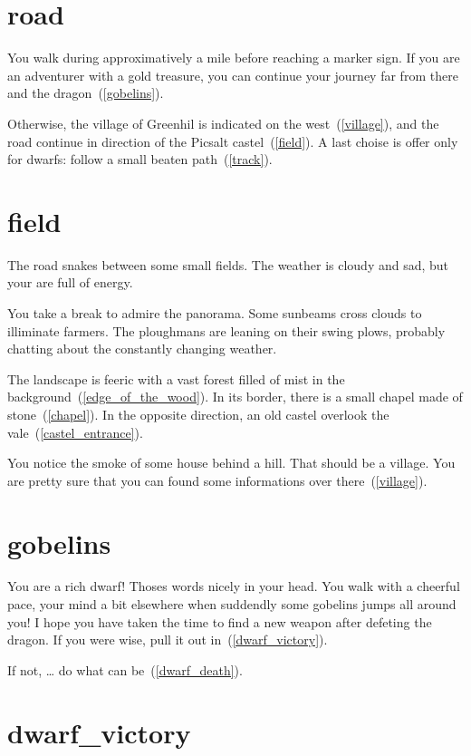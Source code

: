 \section{road}

You walk during approximatively a mile before reaching a marker sign. If you are
an adventurer with a gold treasure, you can continue your journey far from there and
the dragon~(\ref{gobelins}).

Otherwise, the village of Greenhil is indicated on the west~(\ref{village}), and
the road continue in direction of the Picsalt castel~(\ref{field}). A last
choise is offer only for dwarfs: follow a small beaten path~(\ref{track}).

\section{field}

The road snakes between some small fields. The weather is cloudy and sad, but
your are full of energy.

You take a break to admire the panorama. Some sunbeams cross clouds to
illiminate farmers. The ploughmans are leaning on their swing plows, probably
chatting about the constantly changing weather.

The landscape is feeric with a vast forest filled of mist in the
background~(\ref{edge_of_the_wood}). In its border, there is a small chapel made
of stone~(\ref{chapel}). In the opposite direction, an old castel overlook the
vale~(\ref{castel_entrance}).

You notice the smoke of some house behind a hill. That should be a village. You
are pretty sure that you can found some informations over there~(\ref{village}).


\section{gobelins}

You are a rich dwarf! Thoses words nicely in your head. You walk with a cheerful
pace, your mind a bit elsewhere when suddendly some gobelins jumps all around
you! I hope you have taken the time to find a new weapon after defeting the dragon. If
you were wise, pull it out in~(\ref{dwarf_victory}).

If not, … do what can be~(\ref{dwarf_death}).

\section{dwarf_victory}

